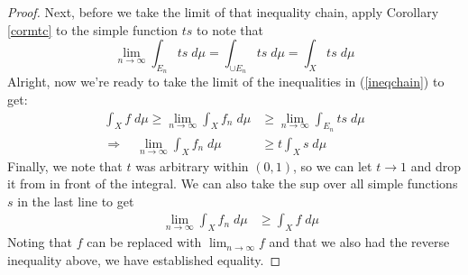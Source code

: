 \documentclass[12pt]{article}
\theoremstyle{plain}
\theoremstyle{definition}
\theoremstyle{remark}
\begin{document}
\begin{proof}
Next, before we take the limit of that inequality chain, apply Corollary \ref{cormtc} to the simple function $ts$ to note that 
\[
    \lim_{n\rightarrow\infty} \int_{E_n} ts \; d\mu
    = \int_{\cup E_n} ts \;d\mu
    = \int_{X} ts \;d\mu
\]
Alright, now we're ready to take the limit of the inequalities in (\ref{ineqchain}) to get:
\begin{align*}
    \int_X f\;d\mu \geq \lim_{n\rightarrow\infty}
    \int_X f_n\;d\mu &\geq
     \lim_{n\rightarrow\infty}\int_{E_n} ts \;d\mu \\
    \Rightarrow \quad\lim_{n\rightarrow\infty}
    \int_X f_n\;d\mu &\geq
     t\int_{X} s \;d\mu 
\end{align*}
Finally, we note that $t$ was arbitrary within $(0,1)$, so we can let $t\rightarrow 1$ and drop it from in front of the integral. We can also take the sup over all simple functions $s$ in the last line to get
\begin{align*}
     \quad\lim_{n\rightarrow\infty}
    \int_X f_n\;d\mu &\geq
    \int_{X} f \;d\mu 
\end{align*}
Noting that $f$ can be replaced with $\lim_{n\rightarrow\infty}f$ and that we also had the reverse inequality above, we have established equality.
\end{proof}
\end{document}
